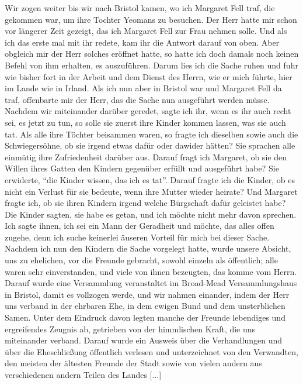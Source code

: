 Wir zogen weiter bis wir nach Bristol kamen, wo ich Margaret
Fell traf, die gekommen war, um ihre Tochter Yeomans 
zu besuchen. Der Herr hatte mir schon vor längerer Zeit gezeigt, das
ich Margaret Fell zur Frau nehmen solle. Und als ich das erste
mal mit ihr redete, kam ihr die Antwort darauf von oben. Aber
obgleich mir der Herr solches eröffnet hatte, so hatte ich doch
damals noch keinen Befehl von ihm erhalten, es auszuführen.
Darum lies ich die Sache ruhen und fuhr wie bisher fort in der
Arbeit und dem Dienst des Herrn, wie er mich führte, hier im
Lande wie in Irland. Als ich nun aber in Bristol war und
Margaret Fell da traf, offenbarte mir der Herr, das die Sache
nun ausgeführt werden müsse. Nachdem wir miteinander darüber
geredet, sagte ich ihr, wenn es ihr auch recht sei, es jetzt zu tun,
so solle sie zuerst ihre Kinder kommen lassen, was sie auch tat.
Als alle ihre Töchter beisammen waren, so fragte ich dieselben
sowie auch die Schwiegersöhne, ob sie irgend etwas dafür oder
dawider hätten? Sie sprachen alle einmütig ihre Zufriedenheit
darüber aus. Darauf fragt ich Margaret, ob sie den Willen ihres
Gatten den Kindern gegenüber erfüllt und ausgeführt habe?
Sie erwiderte, "`die Kinder wissen, das ich es tat"'. Darauf fragte
ich die Kinder, ob es nicht ein Verlust für sie bedeute, wenn
ihre Mutter wieder heirate? Und Margaret fragte ich, ob sie
ihren Kindern irgend welche Bürgschaft dafür geleistet habe?
Die Kinder sagten, sie habe es getan, und ich möchte nicht mehr
davon sprechen. Ich sagte ihnen, ich sei ein Mann der Geradheit
und möchte, das alles offen zugehe, denn ich suche keinerlei
äuseren Vorteil für mich bei dieser Sache. Nachdem ich nun
den Kindern die Sache vorgelegt hatte, wurde unsere Absicht,
uns zu ehelichen, vor die Freunde gebracht, sowohl einzeln als
öffentlich; alle waren sehr einverstanden, und viele von ihnen
bezeugten, das komme vom Herrn. Darauf wurde eine Versammlung
veranstaltet im Broad-Mead Versammlungshaus in Bristol, damit
es vollzogen werde, und wir nahmen einander, indem der Herr
uns verband in der ehrbaren Ehe, in dem ewigen Bund und
dem unsterblichen Samen. Unter dem Eindruck davon legten
manche der Freunde lebendiges und ergreifendes Zeugnis ab,
getrieben von der himmlischen Kraft, die uns miteinander verband.
Darauf wurde ein Ausweis über die Verhandlungen und über
die Eheschließung öffentlich verlesen und unterzeichnet von den
Verwandten, den meisten der ältesten Freunde der Stadt sowie
von vielen andern aus verschiedenen andern Teilen des Landes [...]

